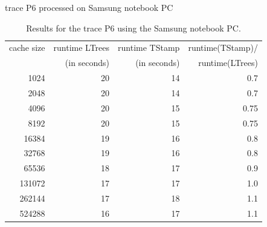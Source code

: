 \documentclass[a4paper,12pt, titlepage]{article}  %
\begin{document}
\begin{table}[p]
\begin{center}
        trace P6 processed on Samsung notebook PC
	\begin{tabular}{|r||r|r|r|}
	  	\hline
                cache size                               &     runtime LTrees         &      runtime TStamp          &  runtime(TStamp)/ \\
                                                             &      (in seconds)            &      (in seconds)                 & runtime(LTrees)     \\
                \hline
                1024					     &         20                       &           14                            &       0.7                  \\
		2048					     &         20                       &           14                            &       0.7                      \\								
		4096					     &         20                       &           15                             &      0.75                       \\	
		8192					     &         20                       &           15                             &      0.75                       \\	
		16384				     &         19                       &           16                             &      0.8                       \\	
		32768				     &         19                       &           16                             &      0.8                       \\	
		65536				     &         18                      &            17                             &      0.9                       \\	
		131072				     &         17                      &            17                             &       1.0                      \\	
		262144				     &         17                      &            18                             &       1.1                      \\	
		524288				     &         16                      &            17                             &       1.1                      \\
                \hline
	\end{tabular}
	\caption{Results for the trace P6 using the Samsung notebook PC.}
        \label{tab:samsung_P6}
\end{center}
\end{table}
\end{document}

